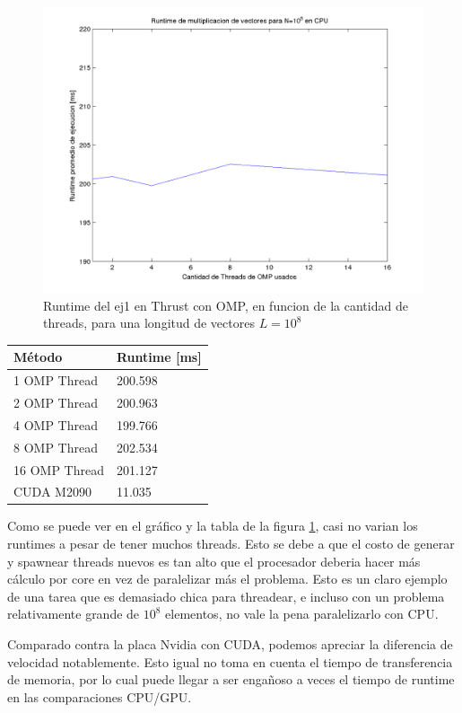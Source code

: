   \begin{figure}[H]
 \begin {center}
 \includegraphics[width=\hrwidth]{plots/ej1omp.png}
 \end {center}
 \caption{Runtime del ej1 en Thrust con OMP, en funcion de la cantidad de threads, para una longitud de vectores $L=10^8$}
 \label{fig:ej1OMP}
 \end{figure}

\begin{table}
    \begin{tabular}{l|l}
        \textbf{M\'etodo} & \textbf{ Runtime [ms] }\\ \hline
    1 OMP Thread         & 200.598      \\
    2 OMP Thread          & 200.963      \\
    4 OMP Thread          & 199.766      \\
    8 OMP Thread  & 202.534      \\
    16 OMP Thread & 201.127      \\
        CUDA M2090 & 11.035 
    \end{tabular}
\end{table}



 Como se puede ver en el gr\'afico y la tabla de la figura \ref{fig:ej1OMP}, casi no varian los runtimes a pesar de tener
 muchos threads. Esto se debe a que el costo de generar y spawnear threads nuevos es tan alto que el procesador
 deberia hacer m\'as c\'alculo por core en vez de paralelizar m\'as el problema. Esto es un claro ejemplo
 de una tarea que es demasiado chica para threadear, e incluso con un problema relativamente grande de $10^8$ 
 elementos, no vale la pena paralelizarlo con CPU.

 Comparado contra la placa Nvidia con CUDA, podemos apreciar la diferencia de velocidad notablemente. Esto igual no toma
 en cuenta el tiempo de transferencia de memoria, por lo cual puede llegar a ser engañoso a veces el tiempo de runtime
 en las comparaciones CPU/GPU.
